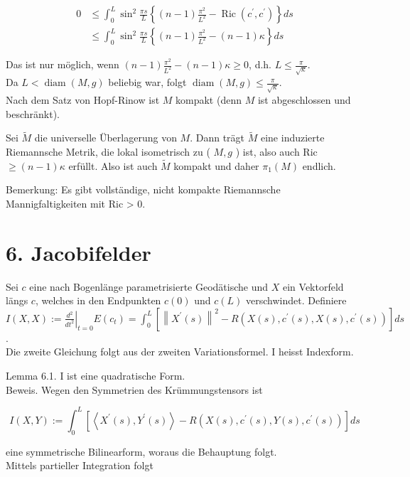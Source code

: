 \documentclass[10pt, letterpaper]{article}
\begin{document}
$$
\begin{aligned}
0 & \leq \int_{0}^{L} \sin ^{2} \frac{\pi s}{L}\left\{(n-1) \frac{\pi^{2}}{L^{2}}-\operatorname{Ric}\left(c^{\prime}, c^{\prime}\right)\right\} d s \\
& \leq \int_{0}^{L} \sin ^{2} \frac{\pi s}{L}\left\{(n-1) \frac{\pi^{2}}{L^{2}}-(n-1) \kappa\right\} d s
\end{aligned}
$$

Das ist nur möglich, wenn $(n-1) \frac{\pi^{2}}{L^{2}}-(n-1) \kappa \geq 0$, d.h. $L \leq \frac{\pi}{\sqrt{\kappa}}$.\\
Da $L<\operatorname{diam}(M, g)$ beliebig war, folgt $\operatorname{diam}(M, g) \leq \frac{\pi}{\sqrt{\kappa}}$.\\
Nach dem Satz von Hopf-Rinow ist $M$ kompakt (denn $M$ ist abgeschlossen und beschränkt).

Sei $\tilde{M}$ die universelle Überlagerung von $M$. Dann trägt $\tilde{M}$ eine induzierte Riemannsche Metrik, die lokal isometrisch zu ( $M, g$ ) ist, also auch Ric $\geq(n-1) \kappa$ erfüllt. Also ist auch $\tilde{M}$ kompakt und daher $\pi_{1}(M)$ endlich.

Bemerkung: Es gibt vollständige, nicht kompakte Riemannsche Mannigfaltigkeiten mit Ric > 0.

\section*{6. Jacobifelder}
Sei $c$ eine nach Bogenlänge parametrisierte Geodätische und $X$ ein Vektorfeld längs $c$, welches in den Endpunkten $c(0)$ und $c(L)$ verschwindet. Definiere\\
$I(X, X):=\left.\frac{d^{2}}{d t^{2}}\right|_{t=0} E\left(c_{t}\right)=\int_{0}^{L}\left[\left\|X^{\prime}(s)\right\|^{2}-R\left(X(s), c^{\prime}(s), X(s), c^{\prime}(s)\right)\right] d s$.\\
Die zweite Gleichung folgt aus der zweiten Variationsformel. I heisst Indexform.

Lemma 6.1. I ist eine quadratische Form.\\
Beweis. Wegen den Symmetrien des Krümmungstensors ist


\begin{equation*}
I(X, Y):=\int_{0}^{L}\left[\left\langle X^{\prime}(s), Y^{\prime}(s)\right\rangle-R\left(X(s), c^{\prime}(s), Y(s), c^{\prime}(s)\right)\right] d s \tag{6}
\end{equation*}


eine symmetrische Bilinearform, woraus die Behauptung folgt.\\
Mittels partieller Integration folgt
\end{document}
